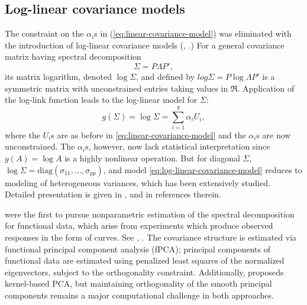 

\subsection{Log-linear covariance models} \label{log-linear-glms}

The constraint on the $\alpha_i$s in (\ref{eq:linear-covariance-model}) was eliminated with the introduction of log-linear covariance models (\cite{chiu1996matrix},  \cite{pinheiro1996unconstrained}.) For a general covariance matrix having spectral decomposition
\begin{equation}
\Sigma = P \Lambda P',
\end{equation}
\noindent
its matrix logarithm, denoted $\log\Sigma$, and defined by $log \Sigma = P \log\Lambda P'$ is a symmetric matrix with unconstrained entries taking values in $\Re$. Application of the log-link function leads to the log-linear model for $\Sigma$:
\begin{equation} \label{eq:log-linear-covariance-model}
g\left(\Sigma\right)  = \log\Sigma  = \sum_{i = 1}^q \alpha_i U_i, 
\end{equation}
\noindent
where the $U_i$s are as before in \ref{eq:linear-covariance-model} and the $\alpha_i$s are now unconstrained. The $\alpha_i$s, however, now lack statistical interpretation since $g\left(A\right) = \log A$ is a highly nonlinear operation. But for diagonal $\Sigma$, $\log \Sigma = \mbox{diag}\left(\sigma_{11},\dots, \sigma_{pp}\right)$, and model \ref{eq:log-linear-covariance-model} reduces to modeling of heterogeneous variances, which has been extensively studied. Detailed presentation is given in \cite{carroll1988transformation}, \cite{verbyla1993modelling} and in references therein. 

\bigskip

\cite{rice1991estimating} were the first to pursue nonparametric estimation of the spectral decomposition for functional data, which arise from experiments which produce observed responses in the form of curves. See \cite{ramsay2006functional}, \cite{ramsay2007applied}. The covariance structure is estimated via functional principal component analysis (fPCA); principal components of functional data are estimated using penalized least squares of the normalized eigenvectors, subject to the orthogonality constraint. Additionally, \cite{boente2000kernel} proposeds kernel-based PCA, but maintaining orthogonality of the smooth principal components remains a major computational challenge in both approaches.

